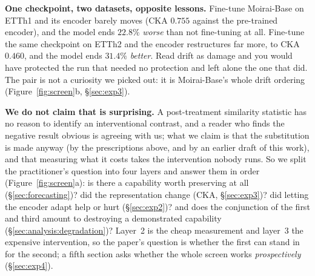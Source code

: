 \textbf{One checkpoint, two datasets, opposite lessons.}  Fine-tune Moirai-Base
on ETTh1 and its encoder barely moves (CKA $0.755$ against the pre-trained
encoder), and the model ends $22.8\%$ \emph{worse} than not fine-tuning at all.
Fine-tune the same checkpoint on ETTh2 and the encoder restructures far more, to
CKA $0.460$, and the model ends $31.4\%$ \emph{better}.  Read drift as damage and
you would have protected the run that needed no protection and left alone the one
that did.  The pair is not a curiosity we picked out: it is Moirai-Base's whole
drift ordering (Figure~\ref{fig:screen}b, \S\ref{sec:exp3}).

\textbf{We do not claim that is surprising.}  A post-treatment similarity
statistic has no reason to identify an interventional contrast, and a reader who
finds the negative result obvious is agreeing with us; what we claim is that the
substitution is made anyway (by the prescriptions above, and by an earlier draft
of this work), and that measuring what it costs takes the intervention nobody
runs.  So we split the
practitioner's question into four layers and answer them in order
(Figure~\ref{fig:screen}a): is there a capability
worth preserving at all (\S\ref{sec:forecasting})?  did the representation change
(CKA, \S\ref{sec:exp3})?  did letting the encoder adapt
help or hurt (\S\ref{sec:exp2})?  and does the conjunction of the first and third
amount to destroying a demonstrated capability
(\S\ref{sec:analysis:degradation})?  Layer~2 is the cheap measurement and layer~3
the expensive intervention, so the paper's question is whether the first can stand
in for the second; a fifth section asks whether the whole screen works
\emph{prospectively} (\S\ref{sec:exp4}).

